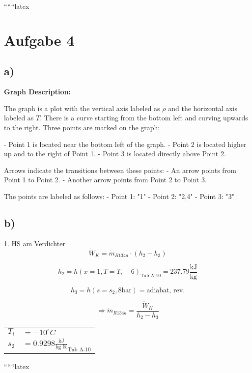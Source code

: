 
``````latex


\section*{Aufgabe 4}

\subsection*{a)}

\begin{center}
\textbf{Graph Description:}

The graph is a plot with the vertical axis labeled as $\rho$ and the horizontal axis labeled as $T$. There is a curve starting from the bottom left and curving upwards to the right. Three points are marked on the graph:

- Point 1 is located near the bottom left of the graph.
- Point 2 is located higher up and to the right of Point 1.
- Point 3 is located directly above Point 2.

Arrows indicate the transitions between these points:
- An arrow points from Point 1 to Point 2.
- Another arrow points from Point 2 to Point 3.

The points are labeled as follows:
- Point 1: "1"
- Point 2: "2,4"
- Point 3: "3"
\end{center}

\subsection*{b)}

1. HS am Verdichter
\[
\dot{W}_K = \dot{m}_{R134a} \cdot (h_2 - h_3)
\]

\[
h_2 = h \left( x = 1, T = T_i - 6 \right)_{\text{Tab A-10}} = 237.79 \frac{\text{kJ}}{\text{kg}}
\]

\[
h_3 = h \left( s = s_2, 8 \text{bar} \right) = \text{adiabat, rev.}
\]

\[
\Rightarrow \dot{m}_{R134a} = \frac{\dot{W}_K}{h_2 - h_3}
\]

\begin{flushright}
\begin{tabular}{rl}
$T_i$ & $= -10^\circ C$ \\
$s_2$ & $= 0.9298 \frac{\text{kJ}}{\text{kg K}}_{\text{Tab A-10}}$ \\
\end{tabular}
\end{flushright}

``````latex


